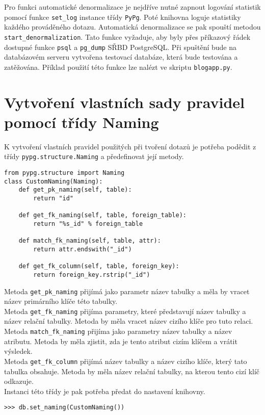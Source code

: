 \documentclass[11pt]{article}
\begin{document}
Pro funkci automatické denormalizace je nejdříve nutné zapnout logování statistik pomocí funkce \lstinline[style=inline]|set_log| instance třídy \lstinline[style=inline]|PyPg|. Poté knihovna loguje statistiky každého prováděného dotazu. Automatická denormalizace se pak spouští metodou \lstinline[style=inline]|start_denormalization|. Tato funkce vyžaduje, aby byly přes příkazový řádek dostupné funkce \lstinline[style=inline]|psql| a \lstinline[style=inline]|pg_dump| SŘBD PostgreSQL. Při spuštění bude na databázovém serveru vytvořena testovací databáze, která bude testována a zatěžována. Příklad použití této funkce lze nalézt ve skriptu \lstinline[style=inline]|blogapp.py|. \\

\section{Vytvoření vlastních sady pravidel pomocí třídy Naming}

K vytvoření vlastních pravidel použitých při tvoření dotazů je potřeba podědit z třídy \lstinline[style=inline]|pypg.structure.Naming| a předefinovat její metody.
\begin{lstlisting}[style=python]
from pypg.structure import Naming
class CustomNaming(Naming):
    def get_pk_naming(self, table):
        return "id"

    def get_fk_naming(self, table, foreign_table):
        return "%s_id" % foreign_table

    def match_fk_naming(self, table, attr):
        return attr.endswith("_id")

    def get_fk_column(self, table, foreign_key):
        return foreign_key.rstrip("_id")
\end{lstlisting}
Metoda \lstinline[style=inline]|get_pk_naming| přijímá jako parametr název tabulky a měla by vracet název primárního klíče této tabulky. \\
Metoda \lstinline[style=inline]|get_fk_naming| přijíma parametry, které představují název tabulky a název relační tabulky. Metoda by měla vracet název cizího klíče pro tuto relaci. \\
Metoda \lstinline[style=inline]|match_fk_naming| přijíma jako parametry název tabulky a název atributu. Metoda by měla zjistit, zda je tento atribut cizím klíčem a vrátit výsledek. \\
Metoda \lstinline[style=inline]|get_fk_column| přijímá název tabulky a název cizího klíče, který tato tabulka obsahuje. Metoda by měla název relační tabulky, na kterou tento cizí klíč odkazuje. \\
Instanci této třídy je pak potřeba předat do nastavení knihovny.
\begin{lstlisting}[style=python]
>>> db.set_naming(CustomNaming())
\end{lstlisting}
\end{document}
